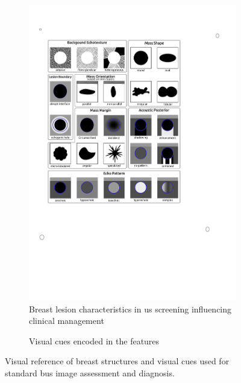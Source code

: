 \begin{figure}
\begin{subfigure}[b]{0.4\textwidth}
        \includegraphics[trim = 65 345 200 124, clip,width=\textwidth]{birads}
        \caption[]%
        {Breast lesion characteristics in \ac{us} screening influencing clinical management~\cite{raza2010us}}    
        \label{fig:features:lexicon}
    \end{subfigure}
    \hfill
    \begin{subfigure}[b]{0.2\textwidth}
      \newcommand{\insertVisualCue}[2]{
        \tikz{\node[label=above:#2]{\texttt{[image: \#1]}};}
      }
      \centering
      \begin{small}
        \insertVisualCue{AppearanceCues}{Appearance}
        \vfill
        \insertVisualCue{AtlasCues}{{Atlas, Brightness}}
        \vfill
        \insertVisualCue{siftCues}{SIFT-BoF}
      \end{small}
      \caption{Visual cues encoded in the features}
      \label{fig:features:relation}
    \end{subfigure}
    \hfill
    \caption {{\small Visual reference of breast structures and visual cues used for standard \ac{bus} image assessment and diagnosis.}} 
    \label{fig:features}
\end{figure}

